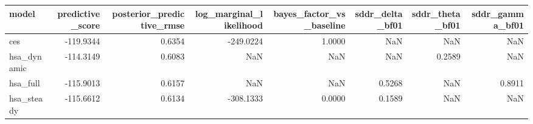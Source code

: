 \begin{tabular}{lrrrrrrr}
\toprule
model & predictive\_score & posterior\_predictive\_rmse & log\_marginal\_likelihood & bayes\_factor\_vs\_baseline & sddr\_delta\_bf01 & sddr\_theta\_bf01 & sddr\_gamma\_bf01 \\
\midrule
ces & -119.9344 & 0.6354 & -249.0224 & 1.0000 & NaN & NaN & NaN \\
hsa\_dynamic & -114.3149 & 0.6083 & NaN & NaN & NaN & 0.2589 & NaN \\
hsa\_full & -115.9013 & 0.6157 & NaN & NaN & 0.5268 & NaN & 0.8911 \\
hsa\_steady & -115.6612 & 0.6134 & -308.1333 & 0.0000 & 0.1589 & NaN & NaN \\
\bottomrule
\end{tabular}
